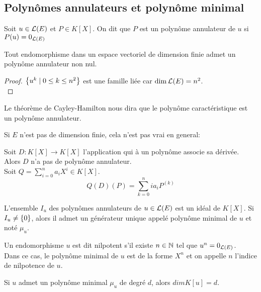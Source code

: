 \subsection{Polynômes annulateurs et polynôme minimal}


\begin{definition}
	Soit $u \in \mathcal{L}(E)$ et $P \in K[X]$. On dit que $P$ est un polynôme annulateur de $u$ si $P(u) = 0_{\mathcal{L}(E)}$
\end{definition}


\begin{prop}
	Tout endomorphisme dans un espace vectoriel de dimension finie admet un polynôme annulateur non nul.
\end{prop}


\begin{proof}
	$\left\{u^k \mid 0 \leq k \leq n^2\right\}$ est une famille liée car $\dim \mathcal{L}(E) = n^2$.\\
\end{proof}


\begin{remarque}
	Le théorème de Cayley-Hamilton nous dira que le polynôme caractéristique est un polynôme annulateur.
\end{remarque}

\begin{remarque}
	Si $E$ n'est pas de dimension finie, cela n'est pas vrai en general:

	Soit $D : K[X] \to K[X]$ l'application qui à un polynôme associe sa dérivée. Alors $D$ n'a pas de polynôme annulateur.\\
	Soit $Q = \sum\limits_{i=0}^n a_iX^i \in K[X]$.
	$$Q(D)(P) = \sum\limits_{k=0}^n ia_i P^{(k)}$$
\end{remarque}



\begin{prop}
	L'ensemble $I_u$ des polynômes annulateurs de $u \in \mathcal{L}(E)$ est un idéal de $K[X]$.
	Si $I_u \neq \left\{0\right\}$, alors il admet un générateur unique appelé polynôme minimal de $u$ et noté $\mu_u$.
\end{prop}


\begin{definition}
	Un endomorphisme $u$ est dit nilpotent s'il existe $n \in \mathbb{N}$ tel que $u^n = 0_{\mathcal{L}(E)}$.\\
	Dans ce cas, le polynôme minimal de $u$ est de la forme $X^n$ et on appelle $n$ l'indice de nilpotence de $u$.
\end{definition}


\begin{remarque}
	Si $u$ admet un polynôme minimal $\mu_u$ de degré $d$, alors $dim K[u] = d$.
\end{remarque}

